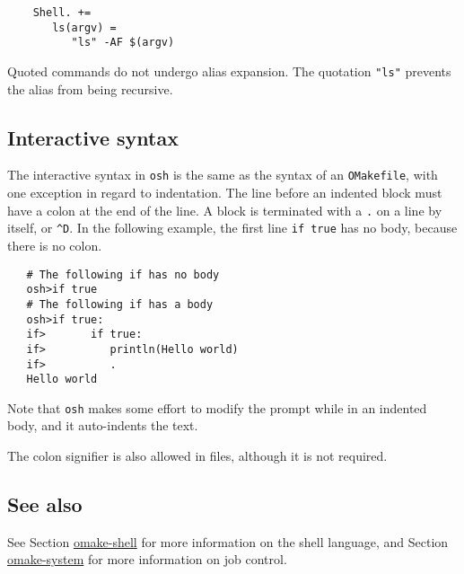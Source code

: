 \begin{verbatim}
    Shell. +=
       ls(argv) =
          "ls" -AF $(argv)
\end{verbatim}

Quoted commands do not undergo alias expansion.  The quotation \verb+"ls"+ prevents the alias from
being recursive.

\subsection{Interactive syntax}

The interactive syntax in \verb+osh+ is the same as the syntax of an \verb+OMakefile+, with one
exception in regard to indentation.  The line before an indented block must have a colon at the end
of the line.  A block is terminated with a \verb+.+ on a line by itself, or \verb+^D+.  In the
following example, the first line \verb+if true+ has no body, because there is no colon.

\begin{verbatim}
   # The following if has no body
   osh>if true
   # The following if has a body
   osh>if true:
   if>       if true:
   if>          println(Hello world)
   if>          .
   Hello world
\end{verbatim}

Note that \verb+osh+ makes some effort to modify the prompt while in an indented body, and it
auto-indents the text.

The colon signifier is also allowed in files, although it is not required.

\subsection{See also}

See Section \href{omake-shell.html}{omake-shell} for more information on the shell language,
and Section \href{omake-system.html}{omake-system} for more information on job control.

